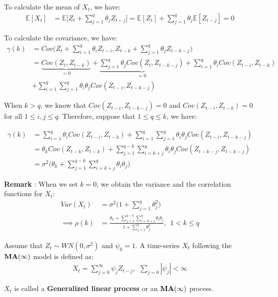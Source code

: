 \begin{proof*}
    To calculate the mean of $X_t$, we have:
    \begin{align*}
        \mathbb{E}[X_t] &= \mathbb{E}\Bigg[
            Z_t + \sum_{j=1}^q \theta_jZ_{t-j} 
        \Bigg] = \mathbb{E}[Z_t] + \sum_{j=1}^q\theta_j \mathbb{E}[Z_{t-j}] = 0
    \end{align*}

    \noindent To calculate the covariance, we have:
    \begin{align*}
        \gamma(k) &= Cov\Bigg( 
            Z_t + \sum_{i=1}^q \theta_i Z_{t-i}, Z_{t-k} + \sum_{j=1}^q \theta_j Z_{t-k-j}    
        \Bigg) \\
        &= \underbrace{Cov(Z_t, Z_{t-k})}_{=0} + \underbrace{\sum_{j=1}^q \theta_j Cov(Z_t, Z_{t-k-j})}_{=0} + \sum_{i=1}^q \theta_i Cov(Z_{t-i}, Z_{t-k}) \\ &+ \sum_{i=1}^q\sum_{j=1}^q \theta_i\theta_j Cov(Z_{t-i}, Z_{t-k-j})
    \end{align*}

    \noindent When $k > q$, we know that $Cov(Z_{t-i}, Z_{t-k-j})=0$ and $Cov(Z_{t-i}, Z_{t-k})=0$ for all $1 \le i, j \le q$. Therefore, suppose that $1\le q\le k$, we have:

    \begin{align*}
        \gamma(k) &= \sum_{i=1}^q \theta_i Cov(Z_{t-i}, Z_{t-k}) + \sum_{i=1}^q\sum_{j=1}^q \theta_i\theta_j Cov(Z_{t-i}, Z_{t-k-j}) \\
        &= \theta_k Cov(Z_{t-k}, Z_{t-k}) + \sum_{j=1}^{q-k}\sum_{i=k+j}^q \theta_i \theta_j Cov(Z_{t-k-j}, Z_{t-k-j}) \\
        &= \sigma^2\Bigg( 
            \theta_k  + \sum_{j=1}^{q-k}\sum_{i=k+j}^q \theta_i \theta_j
        \Bigg)
    \end{align*}

    \noindent \textbf{Remark} : When we set $k=0$, we obtain the variance and the correlation functions for $X_t$:
    \begin{align*}
        Var(X_t) &= \sigma^2 \Bigg( 1 + \sum_{j=1}^q \theta_j^2 \Bigg) \\
        \implies 
        \rho(k) &= \frac{\theta_k  + \sum_{j=1}^{q-k}\sum_{i=k+j}^q \theta_i \theta_j}{1+\sum_{j=1}^q \theta_j^2 }, \ \ 1 < k \le q
    \end{align*}
\end{proof*}

\begin{definition}
    Assume that $Z_t\sim WN(0, \sigma^2)$ and $\psi_0=1$. A time-series $X_t$ following the $\bf MA(\infty)$ model is defined as:
    \begin{align*}
        X_t = \sum_{j=0}^\infty \psi_j Z_{t-j}, \ \ \sum_{j=0}|\psi_j| < \infty
    \end{align*}

    \noindent $X_t$ is called a \textbf{Generalized linear process} or an $\bf MA(\infty)$ process. 
\end{definition}

